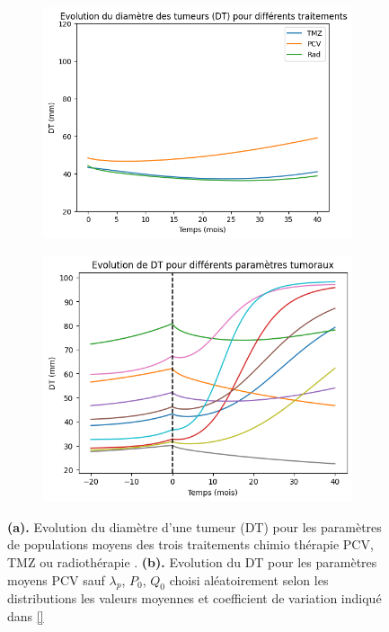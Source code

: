 \documentclass[12pt]{article}
\begin{document}
\begin{figure}
    \centering
    \begin{subfigure}[t]{0.45\textwidth}
        \centering
        \includegraphics[width=\linewidth]{Image/evolution_TD_param_moy.png} 
        \caption{} \label{fig:timing1}
    \end{subfigure}
    \hfill
    \begin{subfigure}[t]{0.45\textwidth}
        \centering
        \includegraphics[width=\linewidth]{Image/ex_traj.png} 
        \caption{} \label{fig:timing2}
    \end{subfigure}

    \caption{\textbf{(a).} Evolution du diamètre d'une tumeur (DT) pour les paramètres de populations moyens des trois traitements chimio thérapie PCV, TMZ ou radiothérapie \cite{}. \textbf{(b).} Evolution du DT pour les paramètres moyens PCV sauf $\lambda_{p}$, $P_{0}$, $Q_{0}$ choisi aléatoirement selon les distributions les valeurs moyennes et coefficient de variation indiqué dans \ref{} }
\end{figure}
\end{document}
